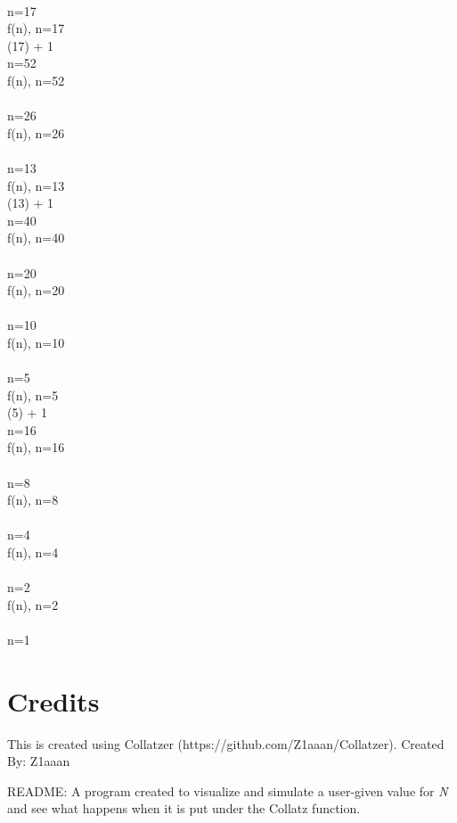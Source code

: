 \documentclass{article}
\begin{document}
 \Rightarrow {} 
 \\ 
 \Rightarrow n=17
 \\[3mm] 
f(n), n=17
 \\ 
 (17) + 1
 \\ 
 \Rightarrow n=52
 \\[3mm] 
f(n), n=52
 \\ 
 \Rightarrow {} 
 \\ 
 \Rightarrow n=26
 \\[3mm] 
f(n), n=26
 \\ 
 \Rightarrow {} 
 \\ 
 \Rightarrow n=13
 \\[3mm] 
f(n), n=13
 \\ 
 (13) + 1
 \\ 
 \Rightarrow n=40
 \\[3mm] 
f(n), n=40
 \\ 
 \Rightarrow {} 
 \\ 
 \Rightarrow n=20
 \\[3mm] 
f(n), n=20
 \\ 
 \Rightarrow {} 
 \\ 
 \Rightarrow n=10
 \\[3mm] 
f(n), n=10
 \\ 
 \Rightarrow {} 
 \\ 
 \Rightarrow n=5
 \\[3mm] 
f(n), n=5
 \\ 
 (5) + 1
 \\ 
 \Rightarrow n=16
 \\[3mm] 
f(n), n=16
 \\ 
 \Rightarrow {} 
 \\ 
 \Rightarrow n=8
 \\[3mm] 
f(n), n=8
 \\ 
 \Rightarrow {} 
 \\ 
 \Rightarrow n=4
 \\[3mm] 
f(n), n=4
 \\ 
 \Rightarrow {} 
 \\ 
 \Rightarrow n=2
 \\[3mm] 
f(n), n=2
 \\ 
 \Rightarrow {} 
 \\ 
 \Rightarrow n=1
 \\[3mm] 

    \section{Credits}
    This is created using Collatzer (https://github.com/Z1aaan/Collatzer).
    Created By: Z1aaan
    
    README:
    A program created to visualize and simulate a user-given value for \textit{N} 
    and see what happens when it is put under the Collatz function.
    
\end{document}
